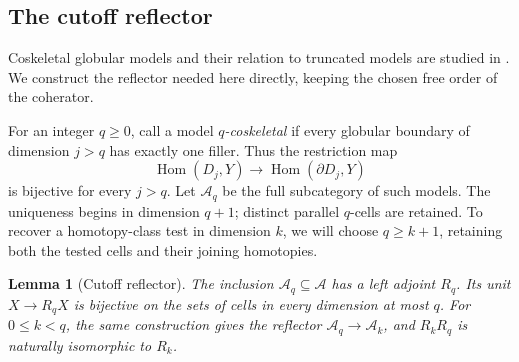 \documentclass[11pt,letterpaper]{article}
\numberwithin{equation}{section}
\theoremstyle{plain}
\newtheorem{lemma}[theorem]{Lemma}
\theoremstyle{definition}
\theoremstyle{remark}
\DeclareMathOperator{\Hom}{Hom}
\begin{document}
\subsection{The cutoff reflector}

Coskeletal globular models and their relation to truncated models are
studied in \cite[Section~2]{HenryLanari2023}.  We construct the reflector
needed here directly, keeping the chosen free order of the coherator.

For an integer $q\geq0$, call a model \emph{$q$-coskeletal} if every
globular boundary of dimension $j>q$ has exactly one filler.  Thus the
restriction map
\[
 \Hom(D_j,Y)\longrightarrow\Hom(\partial D_j,Y)
\]
is bijective for every $j>q$.  Let $\mathcal A_q$ be the full subcategory
of such models.  The uniqueness begins in dimension $q+1$; distinct
parallel $q$-cells are retained.
To recover a homotopy-class test in dimension $k$, we will choose
$q\geq k+1$, retaining both the tested cells and their joining homotopies.

\begin{lemma}[Cutoff reflector]\label{lem:cutoff}
The inclusion $\mathcal A_q\subseteq\mathcal A$ has a left adjoint
$R_q$.  Its unit $X\longrightarrow R_qX$ is bijective on the sets of
cells in every dimension at most $q$.  For $0\leq k<q$, the same
construction gives the reflector $\mathcal A_q\to\mathcal A_k$,
and $R_kR_q$ is naturally isomorphic to $R_k$.
\end{lemma}
\end{document}
